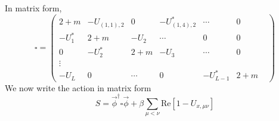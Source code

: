 \documentclass[12pt,a4paper]{article}
\begin{document}
In matrix form,
\begin{equation}
\square = \begin{pmatrix}
	2 + m & -U_{(1,1),2}   & 0 & -U^*_{(1,4),2} & \cdots & 0  \\
	 -U^*_{1} & 2+m & -U_{2} & \cdots & 0 & 0\\
	 0 & -U^*_{2} & 2+m & -U_{3} & \cdots & 0 \\
	 \vdots \\
	-U_{L} & 0 & \cdots & 0& -U^*_{L-1} & 2+m & 
\end{pmatrix}
\end{equation}
We now write the action in matrix form
\begin{equation}
	S = \vec{\phi}^{\dagger}\square\vec{\phi} + \beta\sum_{\mu<\nu}\text{Re} \left[1 - U_{x,\mu\nu} \right]
\end{equation}
\end{document}
